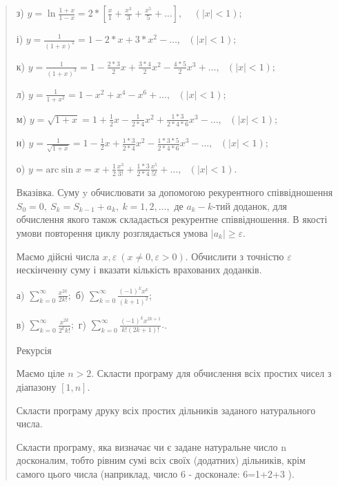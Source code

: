\documentclass[]{article}
\begin{document}
\begin{quote}
з)
\(y = \ln\frac{1 + x}{1 - x} = 2*\left\lbrack \frac{x}{1} + \frac{x^{3}}{3} + \frac{x^{5}}{5} + \ldots \right\rbrack\mathrm{,\ \ \ \ \ }(\left| x \right| < 1);\)

і)
\(y = \frac{1}{(1 + x)^{2}} = 1 - 2*x + 3*x^{2} - \ldots,\mathrm{\text{\ \ \ \ \ }}(\left| x \right| < 1);\)

к)
\(y = \frac{1}{(1 + x)^{3}} = 1 - \frac{2*3}{2}x + \frac{3*4}{2}x^{2} - \frac{4*5}{2}x^{3} + \ldots,\mathrm{\text{\ \ \ \ \ }}(\left| x \right| < 1);\)

л)
\(y = \frac{1}{1 + x^{2}} = 1 - x^{2} + x^{4} - x^{6} + \ldots,\mathrm{\text{\ \ \ \ \ }}(\left| x \right| < 1);\)

м)
\(y = \sqrt{1 + x} = 1 + \frac{1}{2}x - \frac{1}{2*4}x^{2} + \frac{1*3}{2*4*6}x^{3} - \ldots,\mathrm{\text{\ \ \ \ \ }}(\left| x \right| < 1);\)

н)
\(y = \frac{1}{\sqrt{1 + x}} = 1 - \frac{1}{2}x + \frac{1*3}{2*4}x^{2} - \frac{1*3*5}{2*4*6}x^{3} - \ldots,\mathrm{\text{\ \ \ \ \ }}(\left| x \right| < 1);\)

о)
\(y = \mathrm{\text{arc}}\sin x = x + \frac{1}{2}\frac{x^{3}}{3!} + \frac{1*3}{2*4}\frac{x^{5}}{5!} + \ldots,\mathrm{\text{\ \ \ \ \ \ \ }}(\left| x \right|\mathrm{< 1}).\)

Вказівка. Суму y обчислювати за допомогою рекурентного співвідношення
\(S_{0} = 0,\ S_{k} = S_{k - 1} + a_{k},\ k = 1,2,\ldots,\) де
\(a_{k} - k\)-тий доданок, для обчислення якого також складається
рекурентне співвідношення. В якості умови повторення циклу розглядається
умова \(\left| a_{k} \right| \geq \varepsilon.\)

\protect\hypertarget{_Hlk65242018}{}{}Маємо дійсні числа
\(x,\varepsilon\ (x \neq 0,\varepsilon > 0)\). Обчислити з точністю
\(\varepsilon\) нескінченну суму і вказати кількість врахованих
доданків.

а) \(\sum_{k = 0}^{\infty}\frac{x^{2k}}{2k!};\) б)
\(\sum_{k = 0}^{\infty}\frac{( - 1)^{k}x^{k}}{(k + 1)^{2}};\)

в) \(\sum_{k = 0}^{\infty}\frac{x^{2k}}{2^{k}k!};\) г)
\(\sum_{k = 0}^{\infty}\frac{( - 1)^{k}x^{2k + 1}}{k!(2k + 1)!}.\).

Рекурсія

Маємо ціле \(n > 2\). Скласти програму для обчислення всіх простих чисел
з діапазону \(\left\lbrack 1,n \right\rbrack.\)

Скласти програму друку всіх простих дільників заданого натурального
числа.

Скласти програму, яка визначає чи є задане натуральне число n
досконалим, тобто рівним сумі всіх своїх (додатних) дільників, крім
самого цього числа (наприклад, число 6 - досконале: 6=1+2+3 ).


\end{quote}
\end{document}
